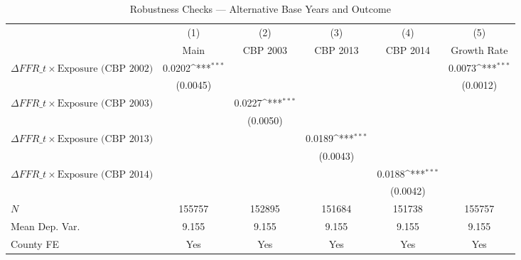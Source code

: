 \begin{table}[htbp]\centering
\def\sym#1{\ifmmode^{#1}\else\(^{#1}\)\fi}
\caption{Robustness Checks --- Alternative Base Years and Outcome}
\begin{tabular}{l*{5}{c}}
\toprule
            &\multicolumn{1}{c}{(1)}&\multicolumn{1}{c}{(2)}&\multicolumn{1}{c}{(3)}&\multicolumn{1}{c}{(4)}&\multicolumn{1}{c}{(5)}\\
            &\multicolumn{1}{c}{Main}&\multicolumn{1}{c}{CBP 2003}&\multicolumn{1}{c}{CBP 2013}&\multicolumn{1}{c}{CBP 2014}&\multicolumn{1}{c}{Growth Rate}\\
\midrule
$\Delta FFR\_t \times \text{Exposure (CBP 2002)}$&      0.0202\sym{***}&                     &                     &                     &      0.0073\sym{***}\\
            &    (0.0045)         &                     &                     &                     &    (0.0012)         \\
\addlinespace
$\Delta FFR\_t \times \text{Exposure (CBP 2003)}$&                     &      0.0227\sym{***}&                     &                     &                     \\
            &                     &    (0.0050)         &                     &                     &                     \\
\addlinespace
$\Delta FFR\_t \times \text{Exposure (CBP 2013)}$&                     &                     &      0.0189\sym{***}&                     &                     \\
            &                     &                     &    (0.0043)         &                     &                     \\
\addlinespace
$\Delta FFR\_t \times \text{Exposure (CBP 2014)}$&                     &                     &                     &      0.0188\sym{***}&                     \\
            &                     &                     &                     &    (0.0042)         &                     \\
\midrule
\(N\)       &      155757         &      152895         &      151684         &      151738         &      155757         \\
Mean Dep. Var.&       9.155         &       9.155         &       9.155         &       9.155         &       9.155         \\
County FE   &         Yes         &         Yes         &         Yes         &         Yes         &         Yes         \\

\end{tabular}
\end{table}
